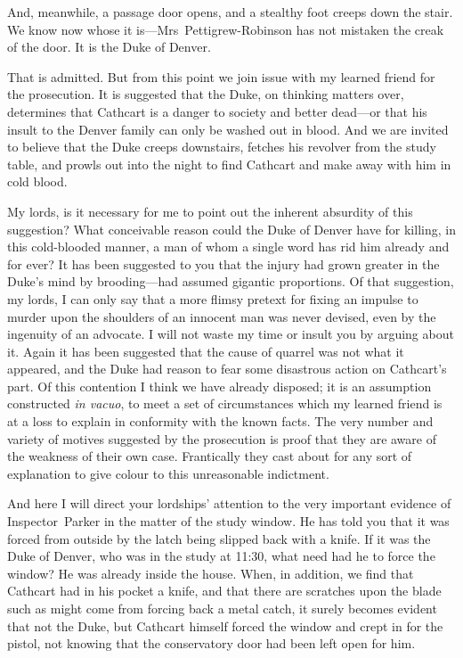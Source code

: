 \begin{dialogue}
\smallskip 

And, meanwhile, a passage door opens, and a stealthy foot creeps down the stair. We know now whose it is—Mrs~Pettigrew-Robinson has not mistaken the creak of the door. It is the Duke of Denver.

\smallskip 

That is admitted. But from this point we join issue with my learned friend for the prosecution. It is suggested that the Duke, on thinking matters over, determines that Cathcart is a danger to society and better dead—or that his insult to the Denver family can only be washed out in blood. And we are invited to believe that the Duke creeps downstairs, fetches his revolver from the study table, and prowls out into the night to find Cathcart and make away with him in cold blood.

\smallskip 

My lords, is it necessary for me to point out the inherent absurdity of this suggestion? What conceivable reason could the Duke of Denver have for killing, in this cold-blooded manner, a man of whom a single word has rid him already and for ever? It has been suggested to you that the injury had grown greater in the Duke's mind by brooding—had assumed gigantic proportions. Of that suggestion, my lords, I can only say that a more flimsy pretext for fixing an impulse to murder upon the shoulders of an innocent man was never devised, even by the ingenuity of an advocate. I will not waste my time or insult you by arguing about it. Again it has been suggested that the cause of quarrel was not what it appeared, and the Duke had reason to fear some disastrous action on Cathcart's part. Of this contention I think we have already disposed; it is an assumption constructed \textit{in vacuo}, to meet a set of circumstances which my learned friend is at a loss to explain in conformity with the known facts. The very number and variety of motives suggested by the prosecution is proof that they are aware of the weakness of their own case. Frantically they cast about for any sort of explanation to give colour to this unreasonable indictment.

\smallskip 

And here I will direct your lordships' attention to the very important evidence of Inspector~Parker in the matter of the study window. He has told you that it was forced from outside by the latch being slipped back with a knife. If it was the Duke of Denver, who was in the study at 11:30, what need had he to force the window? He was already inside the house. When, in addition, we find that Cathcart had in his pocket a knife, and that there are scratches upon the blade such as might come from forcing back a metal catch, it surely becomes evident that not the Duke, but Cathcart himself forced the window and crept in for the pistol, not knowing that the conservatory door had been left open for him.


\end{dialogue}
